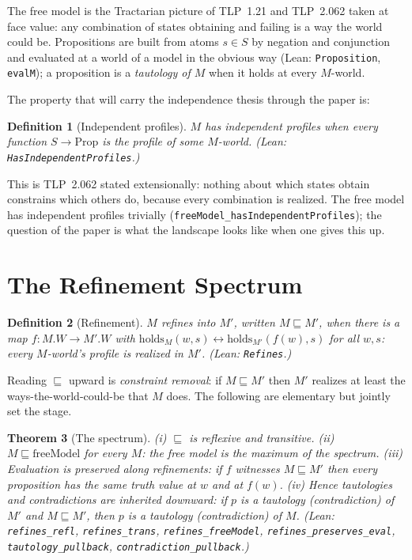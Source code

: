 \documentclass[10pt, letterpaper]{article}
\newtheorem{theorem}{Theorem}[section]
\newtheorem{definition}[theorem]{Definition}
\theoremstyle{remark}
\newcommand{\lean}[1]{\texttt{#1}}
\newcommand{\TLP}[1]{TLP~#1}
\begin{document}
The free model is the Tractarian picture of \TLP{1.21} and \TLP{2.062} taken
at face value: any combination of states obtaining and failing is a way the
world could be. Propositions are built from atoms $s \in S$ by negation and
conjunction and evaluated at a world of a model in the obvious way (Lean:
\lean{Proposition}, \lean{evalM}); a proposition is a \emph{tautology of $M$}
when it holds at every $M$-world.

The property that will carry the independence thesis through the paper is:

\begin{definition}[Independent profiles]\label{def:independence}
$M$ \emph{has independent profiles} when every function $S \to \mathrm{Prop}$
is the profile of some $M$-world. (Lean: \lean{HasIndependentProfiles}.)
\end{definition}

This is \TLP{2.062} stated extensionally: nothing about which states obtain
constrains which others do, because every combination is realized. The free
model has independent profiles trivially
(\lean{freeModel\_hasIndependentProfiles}); the question of the paper is what
the landscape looks like when one gives this up.

\section{The Refinement Spectrum}\label{sec:spectrum}

\begin{definition}[Refinement]\label{def:refines}
$M$ \emph{refines into} $M'$, written $M \sqsubseteq M'$, when there is a map
$f : M.W \to M'.W$ with
$\mathrm{holds}_M(w, s) \leftrightarrow \mathrm{holds}_{M'}(f(w), s)$ for all
$w, s$: every $M$-world's profile is realized in $M'$. (Lean: \lean{Refines}.)
\end{definition}

Reading $\sqsubseteq$ upward is \emph{constraint removal}: if
$M \sqsubseteq M'$ then $M'$ realizes at least the ways-the-world-could-be
that $M$ does. The following are elementary but jointly set the stage.

\begin{theorem}[The spectrum]\label{thm:spectrum}
\emph{(i)} $\sqsubseteq$ is reflexive and transitive.
\emph{(ii)} $M \sqsubseteq \mathrm{freeModel}$ for every $M$: the free model
is the maximum of the spectrum.
\emph{(iii)} Evaluation is preserved along refinements: if $f$ witnesses
$M \sqsubseteq M'$ then every proposition has the same truth value at $w$ and
at $f(w)$.
\emph{(iv)} Hence tautologies and contradictions are inherited \emph{downward}:
if $p$ is a tautology (contradiction) of $M'$ and $M \sqsubseteq M'$, then $p$
is a tautology (contradiction) of $M$.
(Lean: \lean{refines\_refl}, \lean{refines\_trans}, \lean{refines\_freeModel},
\lean{refines\_preserves\_eval}, \lean{tautology\_pullback},
\lean{contradiction\_pullback}.)
\end{theorem}
\end{document}
